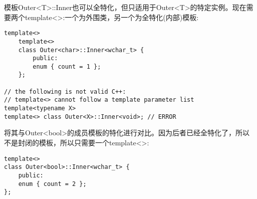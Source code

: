 模板Outer<T>::Inner也可以全特化，但只适用于Outer<T>的特定实例。现在需要两个template<>:一个为外围类，另一个为全特化(内部)模板:

\begin{lstlisting}[style=styleCXX]
template<>
	template<>
	class Outer<char>::Inner<wchar_t> {
		public:
		enum { count = 1 };
	};

// the following is not valid C++:
// template<> cannot follow a template parameter list
template<typename X>
template<> class Outer<X>::Inner<void>; // ERROR
\end{lstlisting}

将其与Outer<bool>的成员模板的特化进行对比。因为后者已经全特化了，所以不是封闭的模板，所以只需要一个template<>:

\begin{lstlisting}[style=styleCXX]
template<>
class Outer<bool>::Inner<wchar_t> {
	public:
	enum { count = 2 };
};
\end{lstlisting}
































